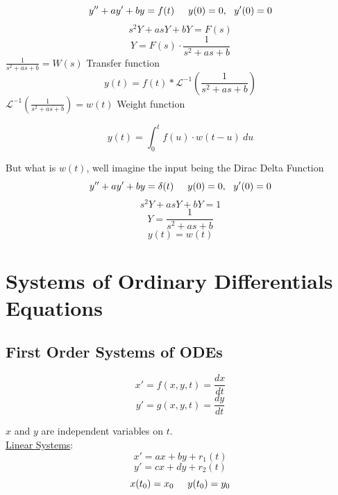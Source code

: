 \documentclass[12pt]{article}
\numberwithin{equation}{subsection}
\newcommand{\lap}{\mathscr{L}}
\newcommand{\dert}[1]{\frac{d #1}{dt}}
\newcommand{\inda}{\hspace{.5cm}}
\newcommand{\indt}{\hspace{10cm}}
\begin{document}
\begin{equation}
y''+ay'+by=f(t) \inda   y(0)=0,\ \ y'(0)=0
\end{equation}
\begin{equation}
s^2Y+asY+bY=F(s)
\end{equation}
\begin{equation}
Y=F(s) \cdot \frac{1}{s^2+as+b}
\end{equation}
\indt $\frac{1}{s^2+as+b} = W(s)$ Transfer function
\begin{equation}
y(t)=f(t) * \lap^{-1}\left(\frac{1}{s^2+as+b}\right)
\end{equation}
\indt $\lap^{-1}\left(\frac{1}{s^2+as+b}\right) = w(t)$ Weight function

\begin{equation}
y(t)=\int_0^t f(u) \cdot w(t-u)\ du
\end{equation}

But what is $w(t)$, well imagine the input being the Dirac Delta Function
\begin{equation}
y''+ay'+by=\delta(t) \inda   y(0)=0,\ \ y'(0)=0
\end{equation}
\begin{equation}
s^2Y+asY+bY=1
\end{equation}
\begin{equation}
Y=\frac{1}{s^2+as+b}
\end{equation}
\begin{equation}
y(t)=w(t)
\end{equation}
\newpage

\section{Systems of Ordinary Differentials Equations}
\subsection{First Order Systems of ODEs}
\begin{equation}
x'=f(x,y,t)=\dert{x}
\end{equation}
\begin{equation}
y'=g(x,y,t)=\dert{y}
\end{equation}

$x$ and $y$ are independent variables on $t$.\\

\underline{Linear Systems}:
\begin{equation}
x'=ax+by+r_1(t)
\end{equation}
\begin{equation}
y'=cx+dy+r_2(t)
\end{equation}
\begin{equation}
x(t_0)=x_0 \inda y(t_0)=y_0
\end{equation}
 
\end{document}
